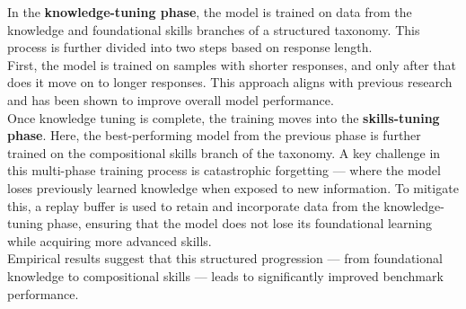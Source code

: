 \documentclass[12pt]{article}
\begin{document}
In the \textbf{knowledge-tuning phase}, the model is trained on data from the knowledge and foundational skills branches of a structured taxonomy. This process is further divided into two steps based on response length.\\
First, the model is trained on samples with shorter responses, and only after that does it move on to longer responses. This approach aligns with previous research and has been shown to improve overall model performance.\vspace{14pt}\\
Once knowledge tuning is complete, the training moves into the \textbf{skills-tuning phase}. Here, the best-performing model from the previous phase is further trained on the compositional skills branch of the taxonomy. A key challenge in this multi-phase training process is catastrophic forgetting — where the model loses previously learned knowledge when exposed to new information. To mitigate this, a replay buffer is used to retain and incorporate data from the knowledge-tuning phase, ensuring that the model does not lose its foundational learning while acquiring more advanced skills.\\
Empirical results suggest that this structured progression — from foundational knowledge to compositional skills — leads to significantly improved benchmark performance.\vspace{14pt}\\
\end{document}
